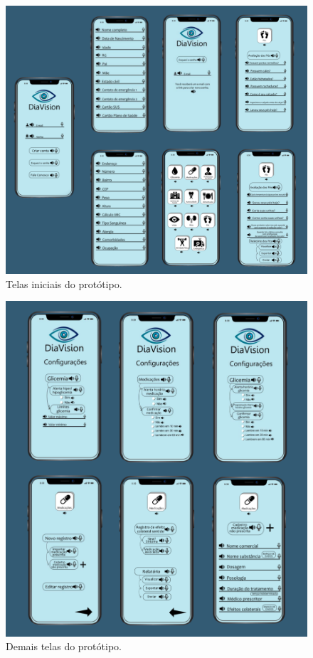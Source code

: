 \begin{figure}[htb]
    \caption{\label{fig_tel_ini_prot}Telas iniciais do protótipo.}
    \begin{center}
        \includegraphics[scale=0.57]{Imagens/proposta/telas_iniciais_prot.png}
    \end{center}
\end{figure}

\begin{figure}[htb]
    \caption{\label{fig_tel_pos_prot}Demais telas do protótipo.}
    \begin{center}
        \includegraphics[scale=0.45]{Imagens/proposta/telas_post_prot.png}
    \end{center}
\end{figure}